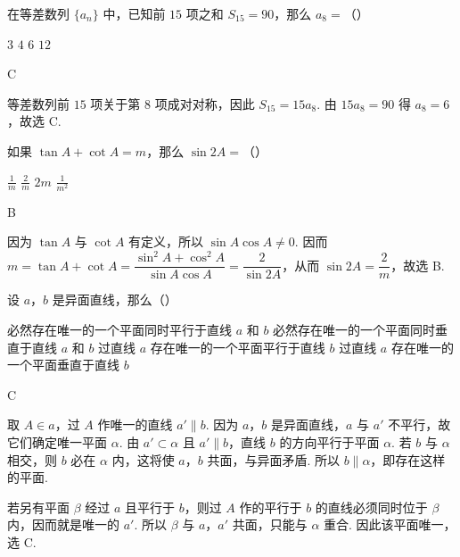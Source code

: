 \begin{problem}
在等差数列 \(\{a_n\}\) 中，已知前 \(15\) 项之和 \(S_{15} = 90\)，那么 \(a_8 =\)（\quad）

\choices
    {\(3\)}
    {\(4\)}
    {\(6\)}
    {\(12\)}
\end{problem}

\begin{answer}
C
\end{answer}

\begin{solution}
等差数列前 \(15\) 项关于第 \(8\) 项成对对称，因此 \(S_{15}=15a_8\). 由 \(15a_8=90\) 得 \(a_8=6\)，故选 C.
\end{solution}

\begin{problem}
如果 \(\tan A + \cot A = m\)，那么 \(\sin 2A =\)（\quad）

\choices
    {\(\frac{1}{m}\)}
    {\(\frac{2}{m}\)}
    {\(2m\)}
    {\(\frac{1}{m^2}\)}
\end{problem}

\begin{answer}
B
\end{answer}

\begin{solution}
因为 \(\tan A\) 与 \(\cot A\) 有定义，所以 \(\sin A\cos A\ne0\). 因而
\(m=\tan A+\cot A=\dfrac{\sin^2A+\cos^2A}{\sin A\cos A}=\dfrac{2}{\sin2A}\)，从而 \(\sin2A=\dfrac{2}{m}\)，故选 B.
\end{solution}

\begin{problem}
设 \(a\)，\(b\) 是异面直线，那么（\quad）

\choices
    {必然存在唯一的一个平面同时平行于直线 \(a\) 和 \(b\)}
    {必然存在唯一的一个平面同时垂直于直线 \(a\) 和 \(b\)}
    {过直线 \(a\) 存在唯一的一个平面平行于直线 \(b\)}
    {过直线 \(a\) 存在唯一的一个平面垂直于直线 \(b\)}
\end{problem}

\begin{answer}
C
\end{answer}

\begin{solution}
取 \(A\in a\)，过 \(A\) 作唯一的直线 \(a'\parallel b\). 因为 \(a\)，\(b\) 是异面直线，\(a\) 与 \(a'\) 不平行，故它们确定唯一平面 \(\alpha\). 由 \(a'\subset\alpha\) 且 \(a'\parallel b\)，直线 \(b\) 的方向平行于平面 \(\alpha\). 若 \(b\) 与 \(\alpha\) 相交，则 \(b\) 必在 \(\alpha\) 内，这将使 \(a\)，\(b\) 共面，与异面矛盾. 所以 \(b\parallel\alpha\)，即存在这样的平面.

若另有平面 \(\beta\) 经过 \(a\) 且平行于 \(b\)，则过 \(A\) 作的平行于 \(b\) 的直线必须同时位于 \(\beta\) 内，因而就是唯一的 \(a'\). 所以 \(\beta\) 与 \(a\)，\(a'\) 共面，只能与 \(\alpha\) 重合. 因此该平面唯一，选 C.
\end{solution}

